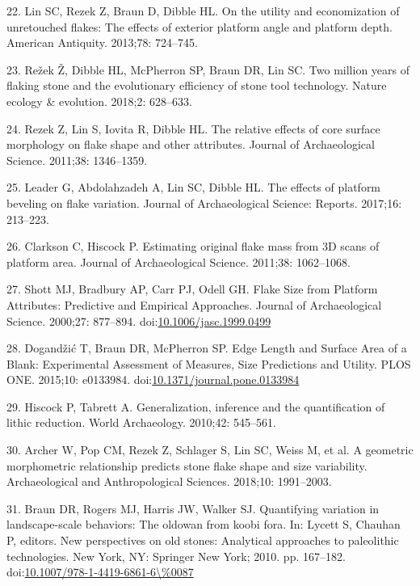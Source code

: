 \documentclass[10pt,letterpaper]{article}
\newenvironment{cslreferences}%
  {}%
  {\par}
\begin{document}
\begin{cslreferences}
\leavevmode\hypertarget{ref-lin_utility_2013-1}{}%
22. Lin SC, Rezek Z, Braun D, Dibble HL. On the utility and
economization of unretouched flakes: The effects of exterior platform
angle and platform depth. American Antiquity. 2013;78: 724--745.

\leavevmode\hypertarget{ref-rezek_two_2018-1}{}%
23. Režek Ž, Dibble HL, McPherron SP, Braun DR, Lin SC. Two million
years of flaking stone and the evolutionary efficiency of stone tool
technology. Nature ecology \& evolution. 2018;2: 628--633.

\leavevmode\hypertarget{ref-rezek_relative_2011-1}{}%
24. Rezek Z, Lin S, Iovita R, Dibble HL. The relative effects of core
surface morphology on flake shape and other attributes. Journal of
Archaeological Science. 2011;38: 1346--1359.

\leavevmode\hypertarget{ref-leader_effects_2017}{}%
25. Leader G, Abdolahzadeh A, Lin SC, Dibble HL. The effects of platform
beveling on flake variation. Journal of Archaeological Science: Reports.
2017;16: 213--223.

\leavevmode\hypertarget{ref-clarkson_estimating_2011-1}{}%
26. Clarkson C, Hiscock P. Estimating original flake mass from 3D scans
of platform area. Journal of Archaeological Science. 2011;38:
1062--1068.

\leavevmode\hypertarget{ref-shott_flake_2000}{}%
27. Shott MJ, Bradbury AP, Carr PJ, Odell GH. Flake Size from Platform
Attributes: Predictive and Empirical Approaches. Journal of
Archaeological Science. 2000;27: 877--894.
doi:\href{https://doi.org/10.1006/jasc.1999.0499}{10.1006/jasc.1999.0499}

\leavevmode\hypertarget{ref-dogandzic_edge_2015}{}%
28. Dogandžić T, Braun DR, McPherron SP. Edge Length and Surface Area of
a Blank: Experimental Assessment of Measures, Size Predictions and
Utility. PLOS ONE. 2015;10: e0133984.
doi:\href{https://doi.org/10.1371/journal.pone.0133984}{10.1371/journal.pone.0133984}

\leavevmode\hypertarget{ref-hiscock_generalization_2010}{}%
29. Hiscock P, Tabrett A. Generalization, inference and the
quantification of lithic reduction. World Archaeology. 2010;42:
545--561.

\leavevmode\hypertarget{ref-archer_geometric_2018}{}%
30. Archer W, Pop CM, Rezek Z, Schlager S, Lin SC, Weiss M, et al. A
geometric morphometric relationship predicts stone flake shape and size
variability. Archaeological and Anthropological Sciences. 2018;10:
1991--2003.

\leavevmode\hypertarget{ref-Braun2010}{}%
31. Braun DR, Rogers MJ, Harris JW, Walker SJ. Quantifying variation in
landscape-scale behaviors: The oldowan from koobi fora. In: Lycett S,
Chauhan P, editors. New perspectives on old stones: Analytical
approaches to paleolithic technologies. New York, NY: Springer New York;
2010. pp. 167--182.
doi:\href{https://doi.org/10.1007/978-1-4419-6861-6/\%0087}{10.1007/978-1-4419-6861-6\textbackslash\%0087}


\end{cslreferences}
\end{document}

